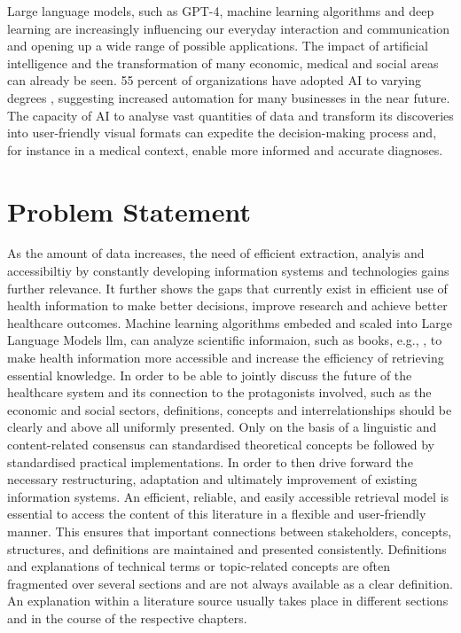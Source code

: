 Large language models, such as GPT-4, machine learning algorithms and deep learning are increasingly influencing our everyday interaction and communication and opening up a wide range of possible applications. 
The impact of artificial intelligence and the transformation of many economic, medical and social areas can already be seen. 
55 percent of organizations have adopted AI to varying degrees \citep{mckinsey_ai_2023}, suggesting increased automation for many businesses in the near future. 
The capacity of AI to analyse vast quantities of data and transform its discoveries into user-friendly visual formats can expedite the decision-making process and, for instance in a medical context,  enable more informed and accurate diagnoses.\citep{esteva_skin_cancer}
\section{Problem Statement}
As the amount of data increases, the need of efficient extraction, analyis and accessibiltiy by constantly developing information systems and technologies gains further relevance. 
It further shows the gaps that currently exist in efficient use of health information to make better decisions, improve research and achieve better healthcare outcomes. 
Machine learning algorithms embeded and scaled into Large Language Models \ac{llm}, can analyze scientific informaion, such as books, e.g., \citet{bb2}, to make health information more accessible and increase the efficiency of retrieving essential knowledge. 
In order to be able to jointly discuss the future of the healthcare system and its connection to the protagonists involved, such as the economic and social sectors, definitions, concepts and interrelationships should be clearly and above all uniformly presented. 
Only on the basis of a linguistic and content-related consensus can standardised theoretical concepts be followed by standardised practical implementations. 
In order to then drive forward the necessary restructuring, adaptation and ultimately improvement of existing information systems. 
An efficient, reliable, and easily accessible retrieval model is essential to access the content of this literature in a flexible and user-friendly manner. 
This ensures that important connections between stakeholders, concepts, structures, and definitions are maintained and presented consistently. 
Definitions and explanations of technical terms or topic-related concepts are often fragmented over several sections and are not always available as a clear definition. An explanation within a literature source usually takes place in different sections and in the course of the respective chapters. 
